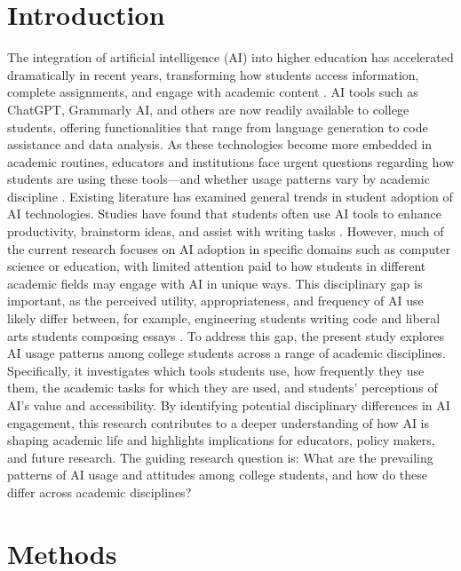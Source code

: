 \documentclass[12pt]{article}
\begin{document}
\section{Introduction}
\label{sec:introduction}
The integration of artificial intelligence (AI) into higher education has accelerated dramatically in recent years, transforming how students access information, complete assignments, and engage with academic content \cite{am}. AI tools such as ChatGPT, Grammarly AI, and others are now readily available to college students, offering functionalities that range from language generation to code assistance and data analysis. As these technologies become more embedded in academic routines, educators and institutions face urgent questions regarding how students are using these tools—and whether usage patterns vary by academic discipline \cite{pedro}.
Existing literature has examined general trends in student adoption of AI technologies. Studies have found that students often use AI tools to enhance productivity, brainstorm ideas, and assist with writing tasks \cite{lin}. However, much of the current research focuses on AI adoption in specific domains such as computer science or education, with limited attention paid to how students in different academic fields may engage with AI in unique ways. This disciplinary gap is important, as the perceived utility, appropriateness, and frequency of AI use likely differ between, for example, engineering students writing code and liberal arts students composing essays \cite{pedro}.
To address this gap, the present study explores AI usage patterns among college students across a range of academic disciplines. Specifically, it investigates which tools students use, how frequently they use them, the academic tasks for which they are used, and students’ perceptions of AI’s value and accessibility. By identifying potential disciplinary differences in AI engagement, this research contributes to a deeper understanding of how AI is shaping academic life and highlights implications for educators, policy makers, and future research.
The guiding research question is: What are the prevailing patterns of AI usage and attitudes among college students, and how do these differ across academic disciplines?

\section{Methods}
\label{sec:methods}
\end{document}
